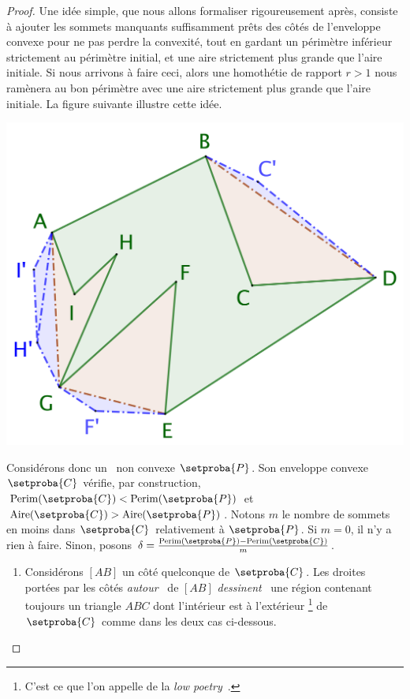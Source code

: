 \begin{proof}
	Une idée simple, que nous allons formaliser rigoureusement après, consiste à ajouter les sommets manquants suffisamment prêts des côtés de l'enveloppe convexe pour ne pas perdre la convexité, tout en gardant un périmètre inférieur strictement au périmètre initial, et une aire strictement plus grande que l'aire initiale. Si nous arrivons à faire ceci, alors une homothétie de rapport $r > 1$ nous ramènera au bon périmètre avec une aire strictement plus grande que l'aire initiale.
	La figure suivante illustre cette idée.

	\begin{center}
		\includegraphics[scale=.4]{content/polygon/necessary-cond/convex-hull-distortion.png}
	\end{center}


	Considérons donc un \ngone\ non convexe $\setproba{P}$.
	Son enveloppe convexe $\setproba{C}$ vérifie, par construction,
	$\perim{\setproba{C}} < \perim{\setproba{P}}$
	et
	$\area{\setproba{C}} > \area{\setproba{P}}$.
	Notons $m$ le nombre de sommets en moins dans $\setproba{C}$ relativement à $\setproba{P}$.
	Si $m = 0$, il n'y a rien à faire.
	Sinon, posons $\delta = \frac{\perim{\setproba{P}} - \perim{\setproba{C}}}{m}$.
	\begin{enumerate}
		\item \label{add-vertex-start}
		Considérons $[AB]$ un côté quelconque de $\setproba{C}$.
		Les droites portées par les côtés \og \emph{autour} \fg\ de $[AB]$ \og \emph{dessinent} \fg\ une région contenant toujours un triangle $ABC$ dont l'intérieur est à l'extérieur
		\footnote{
			C'est ce que l'on appelle de la \og \emph{low poetry} \fg\,.
		}
		de $\setproba{C}$ comme dans les deux cas ci-dessous.
		\begin{multicols}{2}
			\centering


\end{multicols}
\end{enumerate}
\end{proof}
